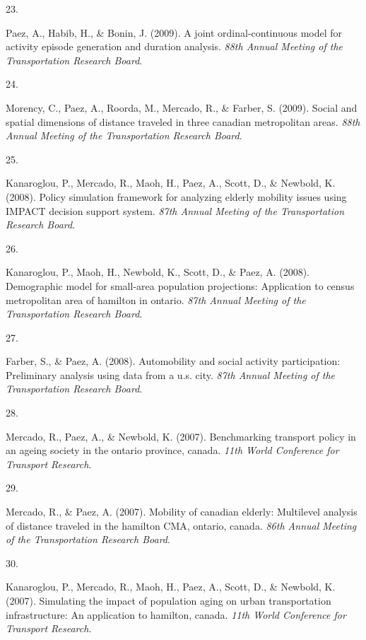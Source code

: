 \documentclass[10pt,a4paper,]{twentysecondcv}
\newlength{\csllabelwidth}
\newcommand{\CSLLeftMargin}[1]{\parbox[t]{\csllabelwidth}{#1}}
\newcommand{\CSLRightInline}[1]{\parbox[t]{\linewidth - \csllabelwidth}{#1}}
\begin{document}
\leavevmode{}%
\CSLLeftMargin{23. }%
\CSLRightInline{Paez, A., Habib, H., \& Bonin, J. (2009). A joint
ordinal-continuous model for activity episode generation and duration
analysis. \emph{88th Annual Meeting of the Transportation Research
Board}.}

\leavevmode{}%
\CSLLeftMargin{24. }%
\CSLRightInline{Morency, C., Paez, A., Roorda, M., Mercado, R., \&
Farber, S. (2009). Social and spatial dimensions of distance traveled in
three canadian metropolitan areas. \emph{88th Annual Meeting of the
Transportation Research Board}.}

\leavevmode{}%
\CSLLeftMargin{25. }%
\CSLRightInline{Kanaroglou, P., Mercado, R., Maoh, H., Paez, A., Scott,
D., \& Newbold, K. (2008). Policy simulation framework for analyzing
elderly mobility issues using IMPACT decision support system. \emph{87th
Annual Meeting of the Transportation Research Board}.}

\leavevmode{}%
\CSLLeftMargin{26. }%
\CSLRightInline{Kanaroglou, P., Maoh, H., Newbold, K., Scott, D., \&
Paez, A. (2008). Demographic model for small-area population
projections: Application to census metropolitan area of hamilton in
ontario. \emph{87th Annual Meeting of the Transportation Research
Board}.}

\leavevmode{}%
\CSLLeftMargin{27. }%
\CSLRightInline{Farber, S., \& Paez, A. (2008). Automobility and social
activity participation: Preliminary analysis using data from a u.s.
city. \emph{87th Annual Meeting of the Transportation Research Board}.}

\leavevmode{}%
\CSLLeftMargin{28. }%
\CSLRightInline{Mercado, R., Paez, A., \& Newbold, K. (2007).
Benchmarking transport policy in an ageing society in the ontario
province, canada. \emph{11th World Conference for Transport Research}.}

\leavevmode{}%
\CSLLeftMargin{29. }%
\CSLRightInline{Mercado, R., \& Paez, A. (2007). Mobility of canadian
elderly: Multilevel analysis of distance traveled in the hamilton CMA,
ontario, canada. \emph{86th Annual Meeting of the Transportation
Research Board}.}

\leavevmode{}%
\CSLLeftMargin{30. }%
\CSLRightInline{Kanaroglou, P., Mercado, R., Maoh, H., Paez, A., Scott,
D., \& Newbold, K. (2007). Simulating the impact of population aging on
urban transportation infrastructure: An application to hamilton, canada.
\emph{11th World Conference for Transport Research}.}
\end{document}
